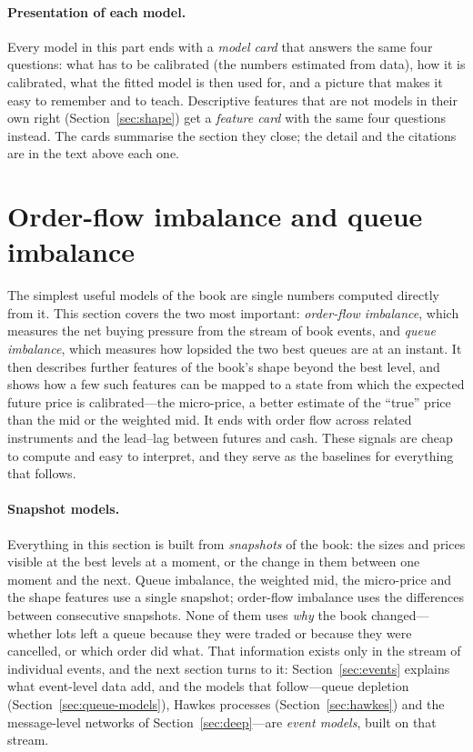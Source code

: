 \paragraph{Presentation of each model.} Every model in this part ends with a \emph{model card} that
answers the same four questions: what has to be calibrated (the numbers estimated from data), how it is
calibrated, what the fitted model is then used for, and a picture that makes it easy to remember and
to teach. Descriptive features that are not models in their own right (Section~\ref{sec:shape}) get a
\emph{feature card} with the same four questions instead. The cards summarise the section they close; the detail and the citations are in the text
above each one.

\section{Order-flow imbalance and queue imbalance}
\label{sec:ofi}

The simplest useful models of the book are single numbers computed directly from it. This section
covers the two most important: \emph{order-flow imbalance}, which measures the net buying pressure
from the stream of book events, and \emph{queue imbalance}, which measures how lopsided the two best
queues are at an instant. It then describes further features of the book's shape beyond the best
level, and shows how a few such features can be mapped to a state from which the expected future price
is calibrated---the micro-price, a better estimate of the ``true'' price than the mid or the weighted
mid. It ends with order flow across related instruments and the lead--lag between futures and cash. These signals are cheap to compute and easy to interpret, and they serve as the
baselines for everything that follows.

\paragraph{Snapshot models.} Everything in this section is built from \emph{snapshots} of the book:
the sizes and prices visible at the best levels at a moment, or the change in them between one
moment and the next. Queue imbalance, the weighted mid, the micro-price and the shape features use a
single snapshot; order-flow imbalance uses the differences between consecutive snapshots. None of them
uses \emph{why} the book changed---whether lots left a queue because they were traded or because they
were cancelled, or which order did what. That information exists only in the stream of individual
events, and the next section turns to it: Section~\ref{sec:events} explains what event-level data add,
and the models that follow---queue depletion (Section~\ref{sec:queue-models}), Hawkes processes
(Section~\ref{sec:hawkes}) and the message-level networks of Section~\ref{sec:deep}---are \emph{event
models}, built on that stream.

